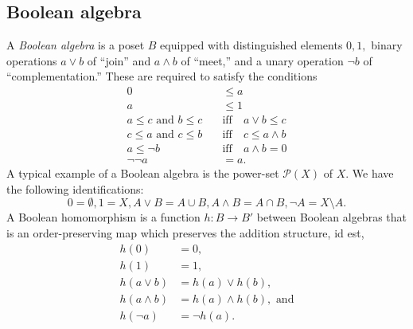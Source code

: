 \subsection{Boolean algebra} \label{boolalg}
A \emph{Boolean algebra} is a poset $B$ equipped with distinguished elements $0, 1,$ binary operations $a\vee b$ of ``join'' and $a\wedge b$ of ``meet,'' and a unary operation $\neg b$ of ``complementation.'' These are required to satisfy the conditions
\begin{align*} 
	0 &\le a\\
	a &\le 1\\
	a \le c \text{ and } b \le c \quad &\text{iff} \quad a \vee b \le c \\
	c \le a \text{ and } c \le b \quad &\text{iff} \quad c \le a \wedge b \\
	a \le \neg b \quad &\text{iff} \quad a \wedge b = 0\\
	\neg\neg a  &= a.
\end{align*}
A typical example of a Boolean algebra is the power-set $\mathcal{P}(X)$ of $X.$ We have the following identifications:
\begin{equation*} 
	0 = \emptyset, 1 = X, A \vee B = A \cup B, A \wedge B = A \cap B, \neg A = X\setminus A.
\end{equation*}
A Boolean homomorphism is a function $h:B\to B'$ between Boolean algebras that is an order-preserving map which preserves the addition structure, id est, 
\begin{align*} 
	h(0) &= 0, \\
	h(1) &= 1, \\
	h(a \vee b) &= h(a) \vee h(b), \\
	h(a \wedge b) &= h(a) \wedge h(b), \text{ and} \\
	h(\neg a) &= \neg h(a).
\end{align*}

